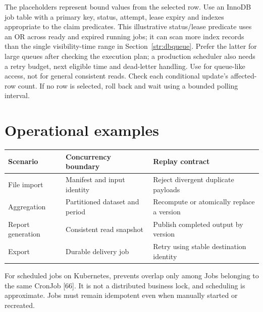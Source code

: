 The placeholders represent bound values from the selected row. Use an
InnoDB job table with a primary key, status, attempt, lease expiry and
indexes appropriate to the claim predicates. This illustrative status/lease predicate uses an OR across ready and expired running jobs; it can scan more index records than the single visibility-time range in Section~\ref{str:dbqueue}. Prefer the latter for large queues after checking the execution plan; a production scheduler also
needs a retry budget, next eligible time and dead-letter handling.
Use  for queue-like access, not for general consistent
reads. Check each conditional update's affected-row count. If no row is
selected, roll back and wait using a bounded polling interval.

\section{Operational examples}
\begin{longtable}{L{.26\linewidth}L{.34\linewidth}L{.32\linewidth}}
\toprule Scenario & Concurrency boundary & Replay contract \\ \midrule\endhead
File import & Manifest and input identity & Reject divergent duplicate payloads \\
Aggregation & Partitioned dataset and period & Recompute or atomically replace a version \\
Report generation & Consistent read snapshot & Publish completed output by version \\
Export & Durable delivery job & Retry using stable destination identity \\
\bottomrule
\end{longtable}
For scheduled jobs on Kubernetes,  prevents
overlap only among Jobs belonging to the same CronJob [66]. It is not a
distributed business lock, and scheduling is approximate. Jobs must remain
idempotent even when manually started or recreated.

